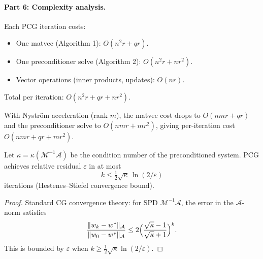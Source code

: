 \paragraph{Part 6: Complexity analysis.}

\begin{theorem}\label{thm:p10-periter}
Each PCG iteration costs:
\begin{itemize}
  \item One matvec (Algorithm 1): $O(n^2 r + qr)$.
  \item One preconditioner solve (Algorithm 2): $O(n^2 r + nr^2)$.
  \item Vector operations (inner products, updates): $O(nr)$.
\end{itemize}
Total per iteration: $O(n^2 r + qr + nr^2)$.

With Nystr\"om acceleration (rank $m$), the matvec cost drops to $O(nmr + qr)$
and the preconditioner solve to $O(nmr + mr^2)$, giving per-iteration cost
$O(nmr + qr + mr^2)$.
\end{theorem}

\begin{theorem}[Convergence]\label{thm:p10-convergence}
Let $\kappa = \kappa(\mathcal{M}^{-1}\mathcal{A})$ be the condition number
of the preconditioned system. PCG achieves relative residual $\varepsilon$
in at most
\[
  k \leq \tfrac{1}{2}\sqrt{\kappa}\,\ln(2/\varepsilon)
\]
iterations (Hestenes--Stiefel convergence bound).
\end{theorem}

\begin{proof}
Standard CG convergence theory: for SPD $\mathcal{M}^{-1}\mathcal{A}$,
the error in the $\mathcal{A}$-norm satisfies
\[
  \frac{\|w_k - w^*\|_\mathcal{A}}{\|w_0 - w^*\|_\mathcal{A}}
  \leq 2\Bigl(\frac{\sqrt{\kappa}-1}{\sqrt{\kappa}+1}\Bigr)^k.
\]
This is bounded by $\varepsilon$ when $k \geq \frac{1}{2}\sqrt{\kappa}\ln(2/\varepsilon)$.
\end{proof}

